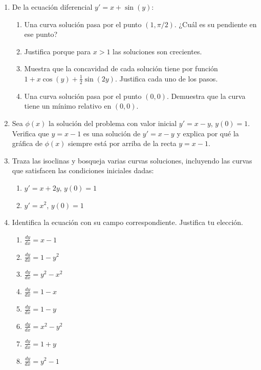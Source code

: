 \documentclass{article}
\begin{document}
\begin{enumerate}
    \item De la ecuación diferencial \( y' = x + \sin(y) \):
    \begin{enumerate}[label=\alph*)]
        \item Una curva solución pasa por el punto \( (1, \pi/2) \). ¿Cuál es su pendiente en ese punto?
        \item Justifica porque para \( x > 1 \) las soluciones son crecientes.
        \item Muestra que la concavidad de cada solución tiene por función \( 1 + x \cos(y) + \frac{1}{2} \sin(2y) \). Justifica cada uno de los pasos.
        \item Una curva solución pasa por el punto \( (0, 0) \). Demuestra que la curva tiene un mínimo relativo en \( (0, 0) \).
    \end{enumerate}
    
    \item Sea \( \phi(x) \) la solución del problema con valor inicial \( y' = x - y \), \( y(0) = 1 \). Verifica que \( y = x - 1 \) es una solución de \( y' = x - y \) y explica por qué la gráfica de \( \phi(x) \) siempre está por arriba de la recta \( y = x - 1 \).
    
    \item Traza las isoclinas y bosqueja varias curvas soluciones, incluyendo las curvas que satisfacen las condiciones iniciales dadas:
    \begin{enumerate}[label=\alph*)]
        \item \( y' = x + 2y \), \( y(0) = 1 \)
        \item \( y' = x^2 \), \( y(0) = 1 \)
    \end{enumerate}
    
    \item Identifica la ecuación con su campo correspondiente. Justifica tu elección.
    \begin{enumerate}[label=\roman*)]
        \item \( \frac{dy}{dx} = x - 1 \)
        \item \( \frac{dy}{dx} = 1 - y^2 \)
        \item \( \frac{dy}{dx} = y^2 - x^2 \)
        \item \( \frac{dy}{dx} = 1 - x \)
        \item \( \frac{dy}{dx} = 1 - y \)
        \item \( \frac{dy}{dx} = x^2 - y^2 \)
        \item \( \frac{dy}{dx} = 1 + y \)
        \item \( \frac{dy}{dx} = y^2 - 1 \)
    \end{enumerate}
\end{enumerate}
\end{document}

